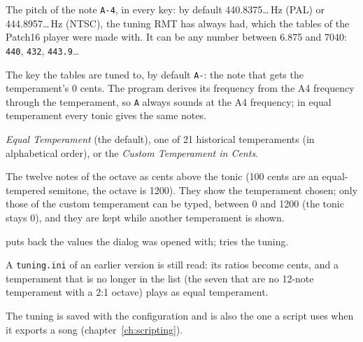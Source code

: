\begin{description}[style=nextline,leftmargin=1.2cm]
  \item[A4 Frequency (Hz)] The pitch of the note \texttt{A-4}, in every key: by default 440.8375\ldots\,Hz (PAL) or 444.8957\ldots\,Hz
        (NTSC), the tuning RMT has always had, which the tables of the Patch16 player were made with. It can be any number between
        6.875 and 7040: \texttt{440}, \texttt{432}, \texttt{443.9}\ldots
  \item[Tonic] The key the tables are tuned to, by default \texttt{A-}: the note that gets the temperament's 0 cents. The program
        derives its frequency from the A4 frequency through the temperament, so \texttt{A} always sounds at the A4 frequency; in equal
        temperament every tonic gives the same notes.
  \item[Temperament] \emph{Equal Temperament} (the default), one of 21 historical temperaments (in alphabetical order), or the
        \emph{Custom Temperament in Cents}.
  \item[Cents] The twelve notes of the octave as cents above the tonic (100 cents are an equal-tempered semitone, the octave is 1200).
        They show the temperament chosen; only those of the custom temperament can be typed, between 0 and 1200 (the tonic stays 0),
        and they are kept while another temperament is shown.
  \item[Reset] puts back the values the dialog was opened with;  tries the tuning.
\end{description}

A \texttt{tuning.ini} of an earlier version is still read: its ratios become cents, and a temperament that is no longer in the list
(the seven that are no 12-note temperament with a 2:1 octave) plays as equal temperament.

The tuning is saved with the configuration and is also the one a script uses when it exports a song (chapter~\ref{ch:scripting}).
